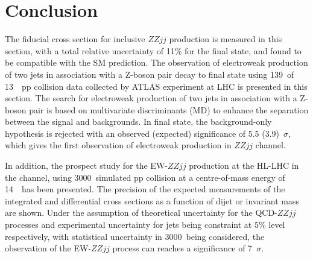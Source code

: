 \section{Conclusion}

The fiducial cross section for inclusive $ZZjj$ production is measured in this section, with a total relative uncertainty of 11\% for the \lllljj final state,
and found to be compatible with the SM prediction.
The observation of electroweak production of two jets in association with a Z-boson pair decay to \llll final state 
using 139~\ifb of 13~\tev~pp collision data collected by ATLAS experiment at LHC is presented in this section.
The search for electroweak production of two jets in association with a Z-boson pair is based on multivariate discriminants (MD) to enhance the separation between the signal and backgrounds.
In \llll final state, the background-only hypothesis is rejected with an observed (expected) significance of 5.5 (3.9)~$\sigma$,
which gives the first observation of electroweak production in $ZZjj$ channel.

In addition, the prospect study for the EW-$ZZjj$ production at the HL-LHC in the \llll channel, using 3000~\ifb simulated pp collision at a centre-of-mass energy of 14~\tev~has been presented.
The precision of the expected measurements of the integrated and differential cross sections as a function of dijet or \llll invariant mass are shown.
Under the assumption of theoretical uncertainty for the QCD-$ZZjj$ processes 
and experimental uncertainty for jets being constraint at 5\% level respectively, 
with statistical uncertainty in 3000~\ifb being considered, 
the observation of the EW-$ZZjj$ process can reaches a significance of 7~$\sigma$.
